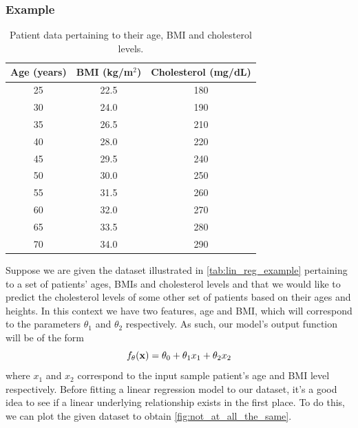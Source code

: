 \documentclass[11pt]{article}
\begin{document}
\subsubsection{Example}

\begin{table}[ht]
    \begin{center}
        \begin{tabular}{c|c||c}
            Age (years) & BMI (kg/m$^2$) & Cholesterol (mg/dL)\\
            \hline
            \hline
            25 & 22.5 & 180 \\
            30 & 24.0 & 190 \\
            35 & 26.5 & 210 \\
            40 & 28.0 & 220 \\
            45 & 29.5 & 240 \\
            50 & 30.0 & 250 \\
            55 & 31.5 & 260 \\
            60 & 32.0 & 270 \\
            65 & 33.5 & 280 \\
            70 & 34.0 & 290 \\
            \hline
        \end{tabular}
    \end{center}
    \vspace{-15pt}
    \caption{Patient data pertaining to their age, BMI and cholesterol levels.}
    \label{tab:lin_reg_example}
\end{table}

\noindent Suppose we are given the dataset illustrated in \autoref{tab:lin_reg_example} pertaining to a set of patients' ages, BMIs and cholesterol levels and that we would like to predict the cholesterol levels of some other set of patients based on their ages and heights. In this context we have two features, age and BMI, which will correspond to the parameters $\theta_1$ and $\theta_2$ respectively. As such, our model's output function will be of the form
$$
f_{\theta}(\mathbf{x})=\theta_0+\theta_1x_1+\theta_2x_2
$$
where $x_1$ and $x_2$ correspond to the input sample patient's age and BMI level respectively. Before fitting a linear regression model to our dataset, it's a good idea to see if a linear underlying relationship exists in the first place. To do this, we can plot the given dataset to obtain \autoref{fig:not_at_all_the_same}.
\end{document}
